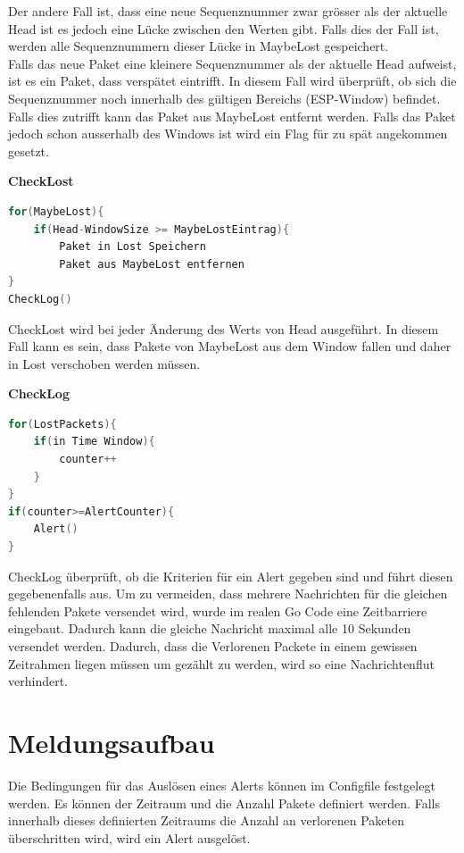 Der andere Fall ist, dass eine neue Sequenznummer zwar grösser als der aktuelle Head ist es jedoch eine Lücke zwischen den Werten gibt. Falls dies der Fall ist, werden alle Sequenznummern dieser Lücke in MaybeLost gespeichert.\\

Falls das neue Paket eine kleinere Sequenznummer als der aktuelle Head aufweist, ist es ein Paket, dass verspätet eintrifft.
In diesem Fall wird überprüft, ob sich die Sequenznummer noch innerhalb des gültigen Bereichs (ESP-Window) befindet. Falls dies zutrifft kann das Paket aus MaybeLost entfernt werden. Falls das Paket jedoch schon ausserhalb des Windows ist wird ein Flag für zu spät angekommen gesetzt.

\textbf{CheckLost}
\begin{lstlisting}[language=go]
for(MaybeLost){
	if(Head-WindowSize >= MaybeLostEintrag){
		Paket in Lost Speichern
		Paket aus MaybeLost entfernen
}
CheckLog()
\end{lstlisting}

CheckLost wird bei jeder Änderung des Werts von Head ausgeführt. In diesem Fall kann es sein, dass Pakete von MaybeLost aus dem Window fallen und daher in Lost verschoben werden müssen.

\textbf{CheckLog}
\begin{lstlisting}[language=go]
for(LostPackets){
	if(in Time Window){
		counter++
	}
}
if(counter>=AlertCounter){
	Alert()
}
\end{lstlisting}

CheckLog überprüft, ob die Kriterien für ein Alert gegeben sind und führt diesen gegebenenfalls aus. Um zu vermeiden, dass mehrere Nachrichten für die gleichen fehlenden Pakete versendet wird, wurde im realen Go Code eine Zeitbarriere eingebaut. Dadurch kann die gleiche Nachricht maximal alle 10 Sekunden versendet werden. Dadurch, dass die Verlorenen Packete in einem gewissen Zeitrahmen liegen müssen um gezählt zu werden, wird so eine Nachrichtenflut verhindert.


\section{ Meldungsaufbau}

\noindent Die Bedingungen für das Auslösen eines Alerts können im Configfile festgelegt werden. Es können der Zeitraum und die Anzahl Pakete definiert werden. Falls innerhalb dieses definierten Zeitraums die Anzahl an verlorenen Paketen überschritten wird, wird ein Alert ausgelöst.


